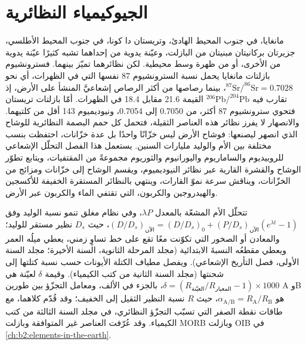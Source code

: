 \chapter{الجيوكيمياء النظائرية}\label{ch:b2:isotope-geochemistry}

مانغايا، في جنوب المحيط الهادئ، وتريستان دا كونا، في جنوب المحيط
الأطلسي، جزيرتان بركانيتان مبنيتان من البازلت، وعيّنة يدوية من
إحداهما تشبه كثيرًا عيّنة يدوية من الأخرى، أو من ظهرة وسط محيطية.
لكن نظائرهما تميّز بينهما. فسترونشيوم بازلتات مانغايا يحمل
نسبة السترونشيوم 87 نفسها التي في الظهرات، أي نحو
$^{87}\mathrm{Sr}/^{86}\mathrm{Sr} = 0.7028$، بينما رصاصها من أكثر الرصاص
إشعاعيَّ المنشأ على الأرض، إذ تقارب فيه $^{206}\mathrm{Pb}/^{204}\mathrm{Pb}$ القيمة 21.6 مقابل
18.4 في الظهرات. أمّا بازلتات تريستان فتحوي سترونشيوم 87 أكثر، من 0.7050 إلى
0.7054، ونيوديميوم 143 أقل من كلتيهما. والانصهار لا يفرز نظائر
هذه العناصر الثقيلة، فتحمل كل حمم البصمة النظائرية
للوشاح الذي انصهر ليصنعها: فوشاح الأرض ليس خزّانًا واحدًا بل
عدة خزّانات، احتفظت بنسب مختلفة بين الأم والوليد مليارات
السنين. يستعمل هذا الفصل التحلّل الإشعاعي للروبيديوم والساماريوم واليورانيوم
والثوريوم مجموعةً من المقتفيات، ويتابع تطوّر الوشاح والقشرة
القارية عبر نظائر النيوديميوم، ويقسم الوشاح إلى
خزّانات ومزائج من الخزّانات، ويناقش سرعة نموّ القارات،
وينتهي بالنظائر المستقرة الخفيفة للأكسجين والهيدروجين والكربون، التي
تقتفي الماء والكربون عبر الأرض.

\begin{recall}
تتحلّل الأم المشعّة بالمعدل $\lambda P$، وفي نظام مغلق تنمو نسبة
الوليد وفق $(D/D_s)_{\text{الآن}} = (D/D_s)_0 + (P/D_s)_{\text{الآن}}
(e^{\lambda t}-1)$، حيث $D_s$ نظير مستقر للوليد؛ والمعادن أو
الصخور التي تكوّنت معًا تقع على خط تساوٍ زمني، يعطي ميلُه العمر ويعطي
مقطعُه النسبةَ الابتدائية (مجلد المرحلة الثانوية، السنة الأخيرة؛ مجلد السنة الأولى،
فصل التأريخ الإشعاعي). ويفصل مطياف الكتلة الأيونات حسب نسبة
كتلتها إلى شحنتها (مجلد السنة الثانية من كتب الكيمياء). وقيمة $\delta$ لعيّنة
هي $\delta = (R_{\text{العيّنة}}/R_{\text{المعيار}} - 1)\times 1000$، بالجزء في
الألف، ومعامل التجزّؤ بين طورين A وB هو
$\alpha_{\mathrm{A/B}} = R_{\mathrm A}/R_{\mathrm B}$، حيث $R$ نسبة النظير
الثقيل إلى الخفيف؛ وقد قُدّم كلاهما، مع طاقات نقطة الصفر
التي تسبّب التجزّؤ النظائري، في مجلد السنة الثالثة من كتب الكيمياء.
وقد عُرّفت العناصر غير المتوافقة وبازلت MORB وبازلت OIB في
\cref{ch:b2:elements-in-the-earth}.
\end{recall}

